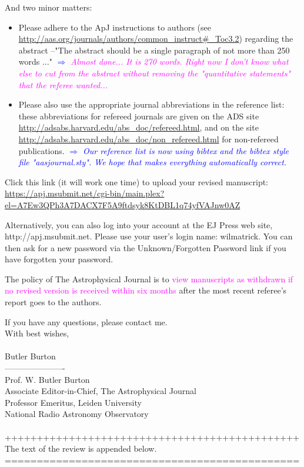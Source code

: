 \documentclass[10pt,a4paper]{article}
\newcommand{\Wilma}[1]{\textcolor{Magenta}{#1}}
\newcommand{\Comment}[1]{\textsl{\textcolor{Blue}{$\Longrightarrow$ {#1}}}}
\begin{document}
And two minor matters: 
\begin{itemize}
\item Please adhere to the ApJ instructions to authors (see \url{http://aas.org/journals/authors/common_instruct#_Toc3.2}) regarding the abstract --"The abstract should be a single paragraph of not more than 250 words ..." \Comment{\Wilma{Almost done... It is 270 words. Right now I don't know what else to cut from the abstract without removing the "quantitative statements" that the referee wanted...}}
\item Please also use the appropriate journal abbreviations in the reference list: these abbreviations for refereed journals are given on the ADS site \url{http://adsabs.harvard.edu/abs_doc/refereed.html}, and on the site
\url{http://adsabs.harvard.edu/abs_doc/non_refereed.html} for non-refereed publications. \Comment{Our reference list is now using bibtex and the bibtex style file "aasjournal.sty". We hope that makes everything automatically correct.}
\end{itemize}

Click this link (it will work one time) to upload your revised manuscript:
\url{https://apj.msubmit.net/cgi-bin/main.plex?el=A7Ew3QPh3A7DACX7F5A9ftdsyk8KtDBL1q74yfVAJnw0AZ}

Alternatively, you can also log into your account at the EJ Press web site,
http://apj.msubmit.net.  Please use your user's login name: wilmatrick.  You can
then ask for a new password via the Unknown/Forgotten Password link if you have
forgotten your password. 

The policy of The Astrophysical Journal is to \Wilma{view manuscripts as withdrawn if no
revised version is received within six months} after the most recent referee's report
goes to the authors.

If you have any questions, please contact me.\\


With best wishes,\\\\
Butler Burton\\
----------------------\\
Prof. W. Butler Burton\\
Associate Editor-in-Chief, The Astrophysical Journal\\
Professor Emeritus, Leiden University\\
National Radio Astronomy Observatory\\
\\++++++++++++++++++++++++++++++++++++++++++++++\\
The text of the review is appended below.\\
==============================================\\\\ 
  
\end{document}
